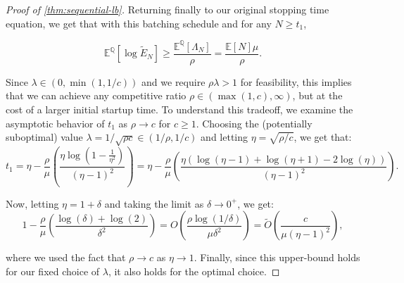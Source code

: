 \documentclass{article}
\newcommand{\E}{\mathbb{E}}
\newcommand{\Alt}{\mathbb{Q}}
\begin{document}
\begin{proof}[Proof of \cref{thm:sequential-lb}]
Returning finally to our original stopping time equation, we get that with this batching schedule and for any $N \geq t_1$,

\begin{equation*}
    \E^\Alt[\log \widetilde E_N] \geq \frac{\E^\Alt[\Lambda_N]}{\rho} = \frac{\E[N]\mu}{\rho}.
\end{equation*}

Since $\lambda \in (0, \min(1,1/c))$ and we require $\rho\lambda > 1$ for feasibility, this implies that we can achieve any competitive ratio $\rho \in (\max(1,c),\infty)$, but at the cost of a larger initial startup time. To understand this tradeoff, we examine the asymptotic behavior of $t_1$ as $\rho \to c$ for $c \geq 1$. Choosing the (potentially suboptimal) value $\lambda = 1/\sqrt{\rho c} \in (1/\rho, 1/c)$ and letting $\eta = \sqrt{\rho/c}$, we get that:
    \begin{equation*}
        t_1 = \eta - \frac{\rho}{\mu} \left( \frac{\eta \log(1-\frac{1}{\eta^2})}{(\eta-1)^2} \right)
        = \eta - \frac{\rho}{\mu} \left( \frac{\eta (\log(\eta-1) + \log(\eta+1) - 2\log(\eta))}{(\eta-1)^2} \right).
    \end{equation*}

Now, letting $\eta = 1+\delta$ and taking the limit as $\delta \to 0^+$, we get:
\begin{equation*}
    1 - \frac{\rho}{\mu} \left( \frac{\log(\delta) + \log(2)}{\delta^2} \right) = O\left( \frac{\rho \log(1/\delta)}{\mu\delta^2} \right) = \tilde O\left( \frac{c}{\mu(\eta-1)^2} \right),
\end{equation*}

where we used the fact that $\rho \to c$ as $\eta \to 1$. Finally, since this upper-bound holds for our fixed choice of $\lambda$, it also holds for the optimal choice.
\end{proof}
\end{document}
